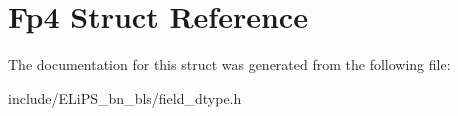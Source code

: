 \hypertarget{struct_fp4}{}\section{Fp4 Struct Reference}
\label{struct_fp4}


The documentation for this struct was generated from the following file\+:\begin{DoxyCompactItemize}
\item 
include/\+E\+Li\+P\+S\+\_\+bn\+\_\+bls/field\+\_\+dtype.\+h\end{DoxyCompactItemize}
